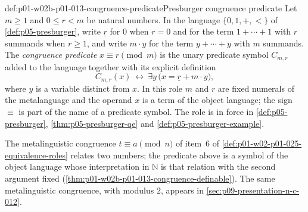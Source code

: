 \begin{hbdefinition}{def:p01-w02b-p01-013-congruence-predicate}{Presburger congruence predicate}
Let \(m\geq1\) and \(0\leq r<m\) be natural numbers.  In the language
\(\{0,1,+,<\}\) of \cref{def:p05-presburger}, write \(\underline r\) for
\(0\) when \(r=0\) and for the term \(1+\cdots+1\) with \(r\) summands when
\(r\geq1\), and write \(m\cdot y\) for the term \(y+\cdots+y\) with \(m\)
summands.  The \emph{congruence predicate} \(x\equiv r\pmod m\) is the unary
predicate symbol \(C_{m,r}\) added to the language together with its explicit
definition
\[
  C_{m,r}(x)\ \leftrightarrow\ \exists y\,\bigl(x=\underline r+m\cdot y\bigr),
\]
where \(y\) is a variable distinct from \(x\).  In this role \(m\) and \(r\)
are fixed numerals of the metalanguage and the operand \(x\) is a term of the
object language; the sign \(\equiv\) is part of the name of a predicate
symbol.  The role is in force in \cref{def:p05-presburger},
\cref{thm:p05-presburger-qe} and \cref{def:p05-presburger-example}.
\end{hbdefinition}

The metalinguistic congruence \(t\equiv a\pmod n\) of item~6 of
\cref{def:p01-w02-p01-025-equivalence-roles} relates two numbers; the
predicate above is a symbol of the object language whose interpretation in
\(\mathbb N\) is that relation with the second argument fixed
(\cref{thm:p01-w02b-p01-013-congruence-definable}).  The same metalinguistic
congruence, with modulus \(2\), appears in \cref{sec:p09-presentation-n-c-012}.

